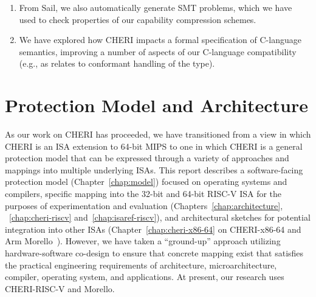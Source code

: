 \begin{enumerate}

\item From Sail, we also automatically generate SMT problems, which we
  have used to check properties of our capability compression
  schemes.


\item We have explored how CHERI impacts a formal specification of C-language
  semantics, improving a number of aspects of our C-language compatibility
  (e.g., as relates to conformant handling of the  type).
\end{enumerate}


\section{Protection Model and Architecture}

As our work on CHERI has proceeded, we have transitioned from a view in which
CHERI is an ISA extension to 64-bit MIPS to one in which CHERI is a general
protection model that can be expressed through a variety of approaches
and mappings into multiple underlying ISAs.
This report describes a software-facing protection model
(Chapter~\ref{chap:model}) focused on operating systems and compilers,
specific mapping into the 32-bit and 64-bit RISC-V ISA for the purposes of experimentation
and evaluation (Chapters~\ref{chap:architecture}, ~\ref{chap:cheri-riscv}
and~\ref{chap:isaref-riscv}), and architectural sketches for potential integration
into other ISAs (Chapter~\ref{chap:cheri-x86-64} on CHERI-x86-64 and Arm
Morello~\cite{arm-morello}).
However, we have taken a ``ground-up'' approach utilizing hardware-software
co-design to ensure that concrete mapping exist that
satisfies the practical engineering requirements of architecture,
microarchitecture, compiler, operating system, and applications.
At present, our research uses CHERI-RISC-V and Morello.

